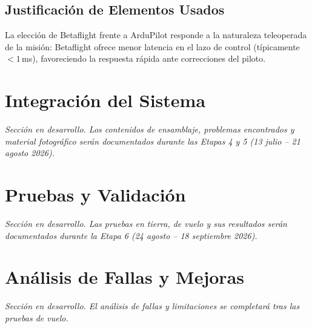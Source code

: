 \documentclass[10pt, twocolumn, letterpaper]{article}
\begin{document}
\subsection{Justificación de Elementos Usados}
La elección de Betaflight frente a ArduPilot responde a la naturaleza teleoperada de la misión: Betaflight ofrece menor latencia en el lazo de control (típicamente $< 1$\,ms), favoreciendo la respuesta rápida ante correcciones del piloto.

\section{Integración del Sistema}
\noindent\textit{Sección en desarrollo. Los contenidos de ensamblaje, problemas encontrados y material fotográfico serán documentados durante las Etapas 4 y 5 (13 julio -- 21 agosto 2026).}

\noindent{}

\section{Pruebas y Validación}
\noindent\textit{Sección en desarrollo. Las pruebas en tierra, de vuelo y sus resultados serán documentados durante la Etapa 6 (24 agosto -- 18 septiembre 2026).}

\noindent{}

\section{Análisis de Fallas y Mejoras}
\noindent\textit{Sección en desarrollo. El análisis de fallas y limitaciones se completará tras las pruebas de vuelo.}

\noindent{}
\end{document}
